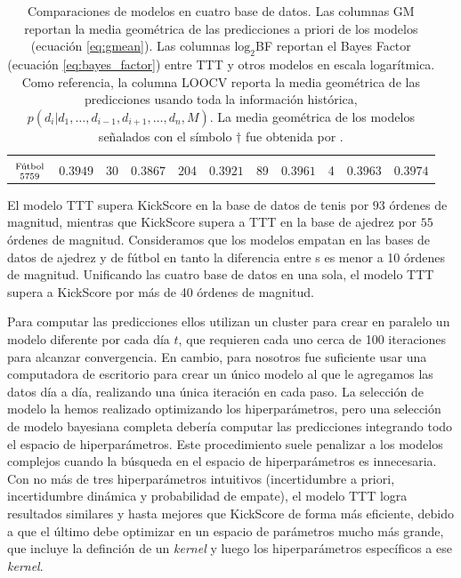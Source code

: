 \documentclass[a4paper,11pt]{book}
\newcommand\hfrac[2]{\genfrac{}{}{0pt}{}{#1}{#2}} %
\theoremstyle{definition}
\newif\ifen
\newcommand{\en}[1]{\ifen#1\fi}
\begin{document}
\begin{table}[ht!]
\begin{tabular}{c|cc|cc|cc|cc|c||c}
 & & & & & & & & & \\
 \multirow{2}{*}{$\hfrac{\text{\scriptsize \en{Football}F\'utbol}}{\num{5759}}$} & \multirow{2}{*}{$0.3949$} & \multirow{2}{*}{\num{30}} & \multirow{2}{*}{$0.3867$} & \multirow{2}{*}{\num{204}} & \multirow{2}{*}{$0.3921$} & \multirow{2}{*}{\num{89}} & \multirow{2}{*}{$\bm{0.3961}$} & \multirow{2}{*}{\num{4}} & \multirow{2}{*}{$\bm{0.3963}$} &  \multirow{2}{*}{${0.3974}$} \\
  & & & & & & & & & & \\ \hline
  \end{tabular}
  \caption{
  Comparaciones de modelos en cuatro base de datos.
  Las columnas GM reportan la media geom\'etrica de las predicciones a priori de los modelos (ecuaci\'on \ref{eq:gmean}).
  Las columnas $\text{log}_2$BF reportan el Bayes Factor (ecuaci\'on \ref{eq:bayes_factor}) entre TTT y otros modelos en escala logar\'itmica.
  Como referencia, la columna LOOCV reporta la media geom\'etrica de las predicciones usando toda la informaci\'on hist\'orica, $p(d_i| d_1, \dots, d_{i-1}, d_{i+1}, \dots, d_n , M)$.
  La media geom\'etrica de los modelos se\~nalados con el s\'imbolo $\dagger$ fue obtenida por \cite{Maystre2019}.
  }
  \label{Tab:Models}
\end{table}
%
El modelo TTT supera KickScore en la base de datos de tenis por $93$ \'ordenes de magnitud, mientras que KickScore supera a TTT en la base de ajedrez por $55$ \'ordenes de magnitud.
%
Consideramos que los modelos empatan en las bases de datos de ajedrez y de f\'utbol en tanto la diferencia entre s es menor a 10 \'ordenes de magnitud.
%
Unificando las cuatro base de datos en una sola, el modelo TTT supera a KickScore por m\'as de 40 \'ordenes de magnitud.

Para computar las predicciones ellos utilizan un cluster para crear en paralelo un modelo diferente por cada d\'ia $t$, que requieren cada uno cerca de 100 iteraciones para alcanzar convergencia.
%
En cambio, para nosotros fue suficiente usar una computadora de escritorio para crear un \'unico modelo al que le agregamos las datos d\'ia a d\'ia, realizando una \'unica iteraci\'on en cada paso.
%
La selecci\'on de modelo la hemos realizado optimizando los hiperpar\'ametros, pero una selecci\'on de modelo bayesiana completa deber\'ia computar las predicciones integrando todo el espacio de hiperpar\'ametros.
%
Este procedimiento suele penalizar a los modelos complejos cuando la b\'usqueda en el espacio de hiperpar\'ametros es innecesaria.
%
Con no m\'as de tres hiperpar\'ametros intuitivos (incertidumbre a priori, incertidumbre din\'amica y probabilidad de empate), el modelo TTT logra resultados similares y hasta mejores que KickScore de forma m\'as eficiente, debido a que el \'ultimo debe optimizar en un espacio de par\'ametros mucho m\'as grande, que incluye la definci\'on de un \emph{kernel} y luego los hiperpar\'ametros espec\'ificos a ese \emph{kernel}.
\end{document}

